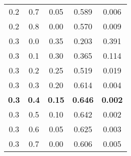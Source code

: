 \documentclass{article}
\begin{document}
\begin{table}[h!]
\begin{tabular}{|c|c|c||c|c|}
	0.2 & 0.7 & 0.05 & 0.589 & 0.006 \\
	0.2 & 0.8 & 0.00 & 0.570 & 0.009 \\
	\hline
	0.3 & 0.0 & 0.35 & 0.203 & 0.391 \\
	0.3 & 0.1 & 0.30 & 0.365 & 0.114 \\
	0.3 & 0.2 & 0.25 & 0.519 & 0.019 \\
	0.3 & 0.3 & 0.20 & 0.614 & 0.004 \\
	\textbf{0.3} & \textbf{0.4} & \textbf{0.15} & \textbf{0.646} & \textbf{0.002} \\
	0.3 & 0.5 & 0.10 & 0.642 & 0.002 \\
	0.3 & 0.6 & 0.05 & 0.625 & 0.003 \\
	0.3 & 0.7 & 0.00 & 0.606 & 0.005 \\
	\hline
\end{tabular}
\label{table:gammaresults1}
\end{table}
\end{document}
